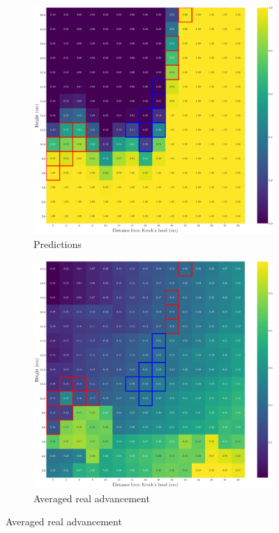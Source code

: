 \begin{figure}[htbp]
    \centering
    \begin{subfigure}[b]{0.66\linewidth}
        \includegraphics[width=\linewidth]{../img/5/custom_patches/walls_heights/walls_heights_preds.png}
        \caption{Predictions}
        \label{fig : walls-heights-preds}
    \end{subfigure}   
    \begin{subfigure}[b]{0.66\linewidth}
        \includegraphics[width=\linewidth]{../img/5/custom_patches/walls_heights/walls_heights_advs.png}
        \caption{Averaged real advancement}
        \label{fig : walls-heights-advs}
    \end{subfigure}   
\end{figure}

